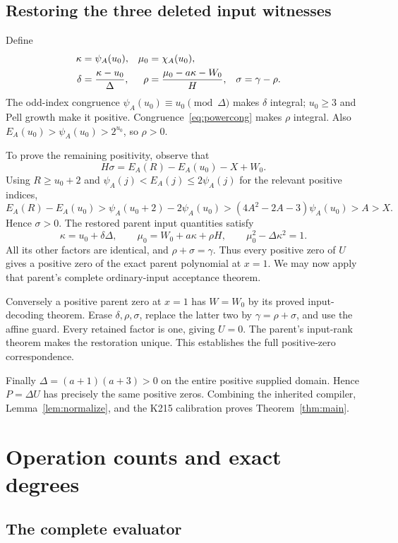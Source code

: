 \documentclass[11pt]{article}
\theoremstyle{remark}\newtheorem{remark}[theorem]{Remark}
\begin{document}
\subsection{Restoring the three deleted input witnesses}

Define
\begin{align}
 \kappa&=\psi_A(u_0),&\mu_0&=\chi_A(u_0),\notag\\
 \delta&=\frac{\kappa-u_0}{\Delta},&
 \rho&=\frac{\mu_0-a\kappa-W_0}{H},&
 \sigma&=\gamma-\rho.\label{eq:restoreinput}
\end{align}
The odd-index congruence $\psi_A(u_0)\equiv u_0\pmod\Delta$
makes $\delta$ integral; $u_0\ge3$ and Pell growth make it
positive. Congruence~\eqref{eq:powercong} makes $\rho$ integral.
Also $E_A(u_0)>\psi_A(u_0)>2^{u_0}$, so $\rho>0$.

To prove the remaining positivity, observe that
\[
 H\sigma=E_A(R)-E_A(u_0)-X+W_0.
\]
Using $R\ge u_0+2$ and
$\psi_A(j)<E_A(j)\le2\psi_A(j)$ for the relevant positive
indices,
\[
 E_A(R)-E_A(u_0)
 >\psi_A(u_0+2)-2\psi_A(u_0)
 >(4A^2-2A-3)\psi_A(u_0)>A>X.
\]
Hence $\sigma>0$. The restored parent input quantities satisfy
\[
 \kappa=u_0+\delta\Delta,
 \qquad \mu_0=W_0+a\kappa+\rho H,
 \qquad \mu_0^2-\Delta\kappa^2=1.
\]
All its other factors are identical, and $\rho+\sigma=\gamma$.
Thus every positive zero of $U$ gives a positive zero of the exact
parent polynomial at $x=1$. We may now apply that parent's complete
ordinary-input acceptance theorem.

Conversely a positive parent zero at $x=1$ has $W=W_0$ by its
proved input-decoding theorem. Erase $\delta,\rho,\sigma$,
replace the latter two by $\gamma=\rho+\sigma$, and use the
affine guard. Every retained factor is one, giving $U=0$.
The parent's input-rank theorem makes the restoration unique.
This establishes the full positive-zero correspondence.

Finally $\Delta=(a+1)(a+3)>0$ on the entire positive supplied
domain. Hence $P=\Delta U$ has precisely the same positive zeros.
Combining the inherited compiler, Lemma~\ref{lem:normalize},
and the K215 calibration proves Theorem~\ref{thm:main}.

\section{Operation counts and exact degrees}\label{sec:counts}

\subsection{The complete evaluator}
\end{document}
